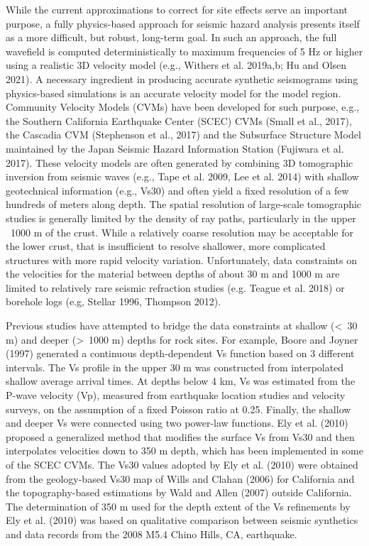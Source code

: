 While the current approximations to correct for site effects serve an important purpose, a fully physics-based approach for seismic hazard analysis presents itself as a more difficult, but robust, long-term goal. In such an approach, the full wavefield is computed deterministically to maximum frequencies of 5 Hz or higher using a realistic 3D velocity model (e.g., Withers et al. 2019a,b; Hu and Olsen 2021). A necessary ingredient in producing accurate synthetic seismograms using physics-based simulations is an accurate velocity model for the model region. Community Velocity Models (CVMs) have been developed for such purpose, e.g., the Southern California Earthquake Center (SCEC) CVMs (Small et al., 2017), the Cascadia CVM (Stephenson et al., 2017) and the Subsurface Structure Model maintained by the Japan Seismic Hazard Information Station (Fujiwara et al. 2017). These velocity models are often generated by combining 3D tomographic inversion from seismic waves (e.g., Tape et al. 2009,  Lee et al. 2014) with shallow geotechnical information (e.g., Vs30) and often yield a fixed resolution of a few hundreds of meters along depth. The spatial resolution of large-scale tomographic studies is generally limited by the density of ray paths, particularly in the upper ~1000 m of the crust. While a relatively coarse resolution may be acceptable for the lower crust, that is insufficient to resolve shallower, more complicated structures with more rapid velocity variation. Unfortunately, data constraints on the velocities for the material between depths of about 30 m and 1000 m are limited to relatively rare seismic refraction studies (e.g. Teague et al. 2018) or borehole logs (e.g, Stellar 1996, Thompson  2012).

Previous studies have attempted to bridge the data constraints at shallow (<~30 m) and deeper (>~1000 m) depths for rock sites. For example, Boore and Joyner (1997) generated a continuous depth-dependent Vs function based on 3 different intervals. The Vs profile in the upper 30 m was constructed from interpolated shallow average arrival times. At depths below 4 km, Vs was estimated from the P-wave velocity (Vp), measured from earthquake location studies and velocity surveys, on the assumption of a fixed Poisson ratio at 0.25. Finally, the shallow and deeper Vs were connected using two power-law functions.  Ely et al. (2010) proposed a generalized method that modifies the surface Vs from Vs30 and then interpolates velocities down to 350 m depth, which has been implemented in some of the SCEC CVMs. The Vs30 values adopted by Ely et al. (2010) were obtained from the geology-based Vs30 map of Wills and Clahan (2006) for California and the topography-based estimations by Wald and Allen (2007) outside California. The determination of  350 m used for the depth extent of the Vs refinements by Ely et al. (2010) was based on qualitative comparison between seismic synthetics and data records from the 2008 M5.4 Chino Hills, CA, earthquake.

